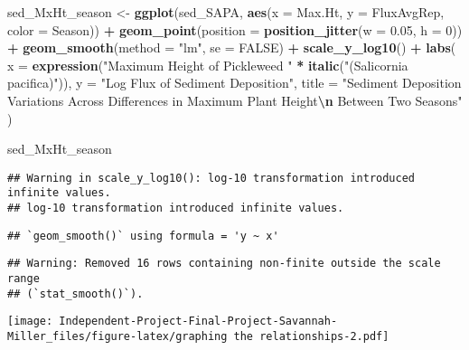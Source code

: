 \documentclass[
]{article}
\newenvironment{Shaded}{\begin{snugshade}}{\end{snugshade}}
\newcommand{\AttributeTok}[1]{\textcolor[rgb]{0.13,0.29,0.53}{#1}}
\newcommand{\ConstantTok}[1]{\textcolor[rgb]{0.56,0.35,0.01}{#1}}
\newcommand{\DecValTok}[1]{\textcolor[rgb]{0.00,0.00,0.81}{#1}}
\newcommand{\FloatTok}[1]{\textcolor[rgb]{0.00,0.00,0.81}{#1}}
\newcommand{\FunctionTok}[1]{\textcolor[rgb]{0.13,0.29,0.53}{\textbf{#1}}}
\newcommand{\NormalTok}[1]{#1}
\newcommand{\OtherTok}[1]{\textcolor[rgb]{0.56,0.35,0.01}{#1}}
\newcommand{\SpecialCharTok}[1]{\textcolor[rgb]{0.81,0.36,0.00}{\textbf{#1}}}
\newcommand{\StringTok}[1]{\textcolor[rgb]{0.31,0.60,0.02}{#1}}
\begin{document}
\begin{Shaded}
\begin{Highlighting}[]
\NormalTok{sed\_MxHt\_season }\OtherTok{\textless{}{-}} \FunctionTok{ggplot}\NormalTok{(sed\_SAPA, }\FunctionTok{aes}\NormalTok{(}\AttributeTok{x =}\NormalTok{ Max.Ht, }\AttributeTok{y =}\NormalTok{ FluxAvgRep, }\AttributeTok{color =}\NormalTok{ Season)) }\SpecialCharTok{+}
  \FunctionTok{geom\_point}\NormalTok{(}\AttributeTok{position =} \FunctionTok{position\_jitter}\NormalTok{(}\AttributeTok{w =} \FloatTok{0.05}\NormalTok{, }\AttributeTok{h =} \DecValTok{0}\NormalTok{)) }\SpecialCharTok{+}
  \FunctionTok{geom\_smooth}\NormalTok{(}\AttributeTok{method =} \StringTok{"lm"}\NormalTok{, }\AttributeTok{se =} \ConstantTok{FALSE}\NormalTok{) }\SpecialCharTok{+}
  \FunctionTok{scale\_y\_log10}\NormalTok{() }\SpecialCharTok{+}
  \FunctionTok{labs}\NormalTok{(}
    \AttributeTok{x =} \FunctionTok{expression}\NormalTok{(}\StringTok{"Maximum Height of Pickleweed "} \SpecialCharTok{*} \FunctionTok{italic}\NormalTok{(}\StringTok{"(Salicornia pacifica)"}\NormalTok{)),}
    \AttributeTok{y =} \StringTok{"Log Flux of Sediment Deposition"}\NormalTok{,}
    \AttributeTok{title =} \StringTok{"Sediment Deposition Variations Across Differences in Maximum Plant Height}\SpecialCharTok{\textbackslash{}n}\StringTok{ Between Two Seasons"}
\NormalTok{  )}

\NormalTok{sed\_MxHt\_season}
\end{Highlighting}
\end{Shaded}

\begin{verbatim}
## Warning in scale_y_log10(): log-10 transformation introduced infinite values.
## log-10 transformation introduced infinite values.
\end{verbatim}

\begin{verbatim}
## `geom_smooth()` using formula = 'y ~ x'
\end{verbatim}

\begin{verbatim}
## Warning: Removed 16 rows containing non-finite outside the scale range
## (`stat_smooth()`).
\end{verbatim}

\texttt{[image: Independent-Project-Final-Project-Savannah-Miller\_files/figure-latex/graphing the relationships-2.pdf]}
\end{document}

